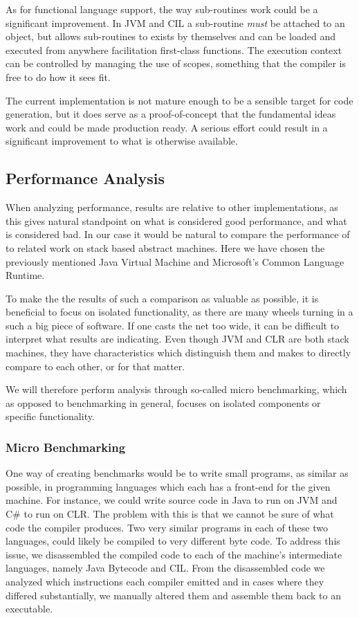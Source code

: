 As for functional language support, the way sub-routines work could be a
significant improvement. In JVM and CIL a sub-routine \emph{must} be attached to
an object, but \thename{} allows sub-routines to exists by themselves and can be
loaded and executed from anywhere facilitation first-class functions. The
execution context can be controlled by managing the use of scopes, something
that the compiler is free to do how it sees fit.

The current implementation is not mature enough to be a sensible target for code
generation, but it does serve as a proof-of-concept that the fundamental ideas
work and could be made production ready. A serious effort could result in a
significant improvement to what is otherwise available.

\subsection{Performance Analysis}

When analyzing performance, results are relative to other implementations, as
this gives natural standpoint on what is considered good performance, and what
is considered bad. In our case it would be natural to compare the performance of
\thename{} to related work on stack based abstract machines. Here we have chosen
the previously mentioned Java Virtual Machine and Microsoft's Common Language
Runtime.

To make the the results of such a comparison as valuable as possible, it is
beneficial to focus on isolated functionality, as there are many wheels turning
in a such a big piece of software. If one casts the net too wide, it can be
difficult to interpret what results are indicating. Even though JVM and CLR are
both stack machines, they have characteristics which distinguish them and makes
to directly compare to each other, or \thename{} for that matter. %

We will therefore perform analysis through so-called micro benchmarking, which
as opposed to benchmarking in general, focuses on isolated components or
specific functionality.

\subsubsection{Micro Benchmarking}

One way of creating benchmarks would be to write small programs, as similar as
possible, in programming languages which each has a front-end for the given
machine. For instance, we could write source code in Java to run on JVM and C\#
to run on CLR. The problem with this is that we cannot be sure of what code the
compiler produces. Two very similar programs in each of these two languages,
could likely be compiled to very different byte code. To address this issue, we
disassembled the compiled code to each of the machine's intermediate languages,
namely Java Bytecode and CIL. From the disassembled code we analyzed which
instructions each compiler emitted and in cases where they differed
substantially, we manually altered them and assemble them back to an executable.

